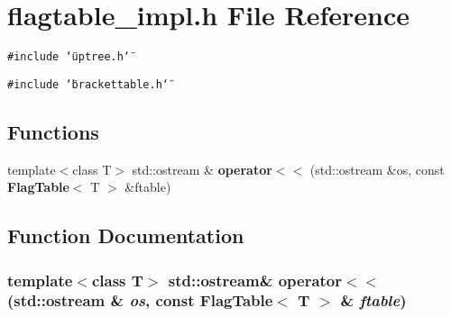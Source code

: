 \section{flagtable\_\-impl.h File Reference}
\label{flagtable__impl_8h}
{\tt \#include \char`\"{}uptree.h\char`\"{}}\par
{\tt \#include \char`\"{}brackettable.h\char`\"{}}\par
\subsection*{Functions}
\begin{CompactItemize}
\item 
template$<$class T$>$ std::ostream \& {\bf operator$<$$<$} (std::ostream \&os, const {\bf Flag\-Table}$<$ T $>$ \&ftable)
\end{CompactItemize}


\subsection{Function Documentation}
\subsubsection{\setlength{\rightskip}{0pt plus 5cm}template$<$class T$>$ std::ostream\& operator$<$$<$ (std::ostream \& {\em os}, const {\bf Flag\-Table}$<$ T $>$ \& {\em ftable})}\label{flagtable__impl_8h_a0}


